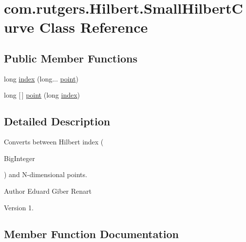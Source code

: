 \hypertarget{classcom_1_1rutgers_1_1Hilbert_1_1SmallHilbertCurve}{}\section{com.\+rutgers.\+Hilbert.\+Small\+Hilbert\+Curve Class Reference}
\label{classcom_1_1rutgers_1_1Hilbert_1_1SmallHilbertCurve}
\subsection*{Public Member Functions}
\begin{DoxyCompactItemize}
\item 
long \hyperlink{classcom_1_1rutgers_1_1Hilbert_1_1SmallHilbertCurve_a71d3f42ef3c4f5c5dc5ac5b5d5dfcd93}{index} (long... \hyperlink{classcom_1_1rutgers_1_1Hilbert_1_1SmallHilbertCurve_a5b2954452f7072df01626959e4fbad8d}{point})
\item 
long \mbox{[}$\,$\mbox{]} \hyperlink{classcom_1_1rutgers_1_1Hilbert_1_1SmallHilbertCurve_a5b2954452f7072df01626959e4fbad8d}{point} (long \hyperlink{classcom_1_1rutgers_1_1Hilbert_1_1SmallHilbertCurve_a71d3f42ef3c4f5c5dc5ac5b5d5dfcd93}{index})
\end{DoxyCompactItemize}


\subsection{Detailed Description}
Converts between Hilbert index (
\begin{DoxyCode}
BigInteger 
\end{DoxyCode}
 ) and N-\/dimensional points.

\begin{DoxyAuthor}{Author}
Eduard Giber Renart 
\end{DoxyAuthor}
\begin{DoxyVersion}{Version}
1. 
\end{DoxyVersion}


\subsection{Member Function Documentation}
\mbox{\label{classcom_1_1rutgers_1_1Hilbert_1_1SmallHilbertCurve_a71d3f42ef3c4f5c5dc5ac5b5d5dfcd93}} 
